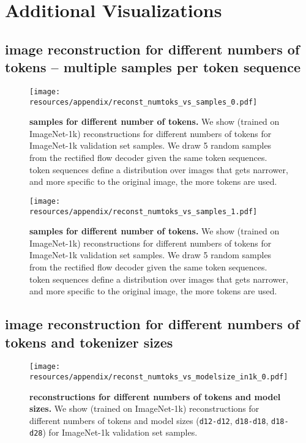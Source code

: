 \clearpage
\section{Additional Visualizations}
\label{sec:app_viz}


\subsection{\ours image reconstruction for different numbers of tokens -- multiple samples per token sequence}
\label{sec:app_reconst_samples_viz}

\begin{figure}[ht!]
\centering
\texttt{[image: resources/appendix/reconst\_numtoks\_vs\_samples\_0.pdf]}
\caption{
\textbf{\ours samples for different number of tokens.}
We show \oursxlarge (trained on ImageNet-1k) reconstructions for different numbers of tokens for ImageNet-1k validation set samples. We draw 5 random samples from the rectified flow decoder given the same token sequences. \ours token sequences define a distribution over images that gets narrower, and more specific to the original image, the more tokens are used.
}
\label{fig:app_reconst_samples_0}
\end{figure}

\begin{figure}[ht!]
\centering
\texttt{[image: resources/appendix/reconst\_numtoks\_vs\_samples\_1.pdf]}
\caption{
\textbf{\ours samples for different number of tokens.}
We show \oursxlarge (trained on ImageNet-1k) reconstructions for different numbers of tokens for ImageNet-1k validation set samples. We draw 5 random samples from the rectified flow decoder given the same token sequences. \ours token sequences define a distribution over images that gets narrower, and more specific to the original image, the more tokens are used.
}
\label{fig:app_reconst_samples_1}
\end{figure}


\clearpage
\subsection{\ours image reconstruction for different numbers of tokens and tokenizer sizes}
\label{sec:app_tokens_vs_model_size_viz}

\begin{figure}[ht!]
\centering
\texttt{[image: resources/appendix/reconst\_numtoks\_vs\_modelsize\_in1k\_0.pdf]}
\caption{
\textbf{\ours reconstructions for different numbers of tokens and model sizes.}
We show \ours (trained on ImageNet-1k) reconstructions for different numbers of tokens and model sizes (\texttt{d12-d12}, \texttt{d18-d18}, \texttt{d18-d28}) for ImageNet-1k validation set samples.
}
\label{fig:app_reconst_vs_model_size_0}
\end{figure}

